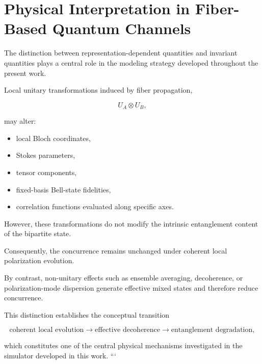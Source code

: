 \section*{Physical Interpretation in Fiber-Based Quantum Channels}

The distinction between representation-dependent quantities and invariant quantities plays a central role in the modeling strategy developed throughout the present work.

\medskip

Local unitary transformations induced by fiber propagation,

\[
U_A \otimes U_B,
\]

may alter:

\begin{itemize}

\item local Bloch coordinates,

\item Stokes parameters,

\item tensor components,

\item fixed-basis Bell-state fidelities,

\item correlation functions evaluated along specific axes.

\end{itemize}

However, these transformations do not modify the intrinsic entanglement content of the bipartite state.

Consequently, the concurrence remains unchanged under coherent local polarization evolution.

\medskip

By contrast, non-unitary effects such as ensemble averaging, decoherence, or polarization-mode dispersion generate effective mixed states and therefore reduce concurrence.

This distinction establishes the conceptual transition

\[
\text{coherent local evolution}
\rightarrow
\text{effective decoherence}
\rightarrow
\text{entanglement degradation},
\]

which constitutes one of the central physical mechanisms investigated in the simulator developed in this work.
```
